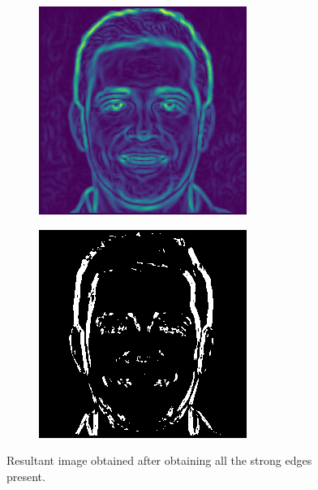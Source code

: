 \documentclass{70_styles/svproc}
\begin{document}
\begin{figure}
     \centering
     \begin{subfigure}[b]{0.2\textwidth}
         \centering
         \includegraphics[width=\textwidth]{70_figures/nondd-seed1830.png}
     \end{subfigure}
     \begin{subfigure}[b]{0.2\textwidth}
         \centering
         \includegraphics[width=\textwidth]{70_figures/sem-seed1830.png}
     \end{subfigure}
     \caption{Resultant image obtained after obtaining all the strong edges present.}
\end{figure}
\end{document}
